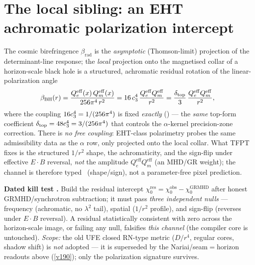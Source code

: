 \section{The local sibling: an EHT achromatic polarization intercept}
The cosmic birefringence $\beta_{\mathrm{rad}}$ is the \emph{asymptotic} (Thomson-limit) projection of the
determinant-line response; the \emph{local} projection onto the magnetised collar of a horizon-scale black
hole is a structured, achromatic residual rotation of the linear-polarization angle 
\[
  \beta_{\mathrm{BH}}(r)=\frac{Q_e^{\mathrm{eff}}(x)\,Q_m^{\mathrm{eff}}(x)}{256\pi^4\,r^2}
  =16\,c_3^4\,\frac{Q_e^{\mathrm{eff}}Q_m^{\mathrm{eff}}}{r^2}
  =\frac{\delta_{\mathrm{top}}}{3}\,\frac{Q_e^{\mathrm{eff}}Q_m^{\mathrm{eff}}}{r^2},
\]
where the coupling $16c_3^4=1/(256\pi^4)$ is fixed \emph{exactly} (\mE) --- the \emph{same} top-form
coefficient $\delta_{\mathrm{top}}=48c_3^4=3/(256\pi^4)$ that controls the $\alpha$-kernel
precision-zone correction. There is \emph{no free coupling}: EHT-class polarimetry probes the same
admissibility data as the $\alpha$ row, only projected onto the local collar. What TFPT fixes is the
structured $1/r^2$ shape, the achromaticity, and the sign-flip under effective $E\!\cdot\!B$ reversal,
\emph{not} the amplitude $Q_e^{\mathrm{eff}}Q_m^{\mathrm{eff}}$ (an MHD/GR weight); the channel is therefore
typed \mC\ (shape/sign), not a parameter-free pixel prediction.
\par\smallskip\noindent\textbf{Dated kill test \mX.} Build the residual intercept
$\chi_0^{\mathrm{res}}=\chi_0^{\mathrm{obs}}-\chi_0^{\mathrm{GRMHD}}$ after honest GRMHD/synchrotron
subtraction; it must pass \emph{three independent nulls} --- frequency (achromatic, no $\lambda^2$ tail),
spatial ($1/r^2$ profile), and sign-flip (reverses under $E\!\cdot\!B$ reversal). A residual statistically
consistent with zero across the horizon-scale image, or failing any null, falsifies \emph{this channel}
(the compiler core is untouched). \emph{Scope:} the old UFE closed RN-type metric ($D/r^4$, regular cores,
shadow shift) is \emph{not} adopted --- it is superseded by the Nariai/seam$=$horizon readouts above
(\vref{v190}); only the polarization signature survives.

